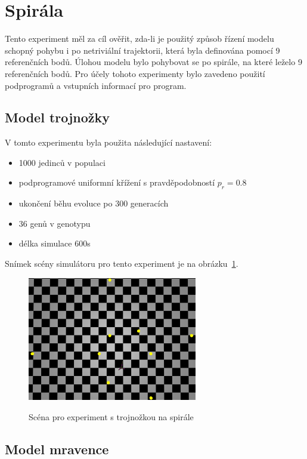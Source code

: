 

\section{Spirála}
Tento experiment měl za cíl ověřit, zda-li je použitý způsob řízení modelu schopný pohybu i po netriviální trajektorii, která byla definována pomocí 9 referenčních bodů.
Úlohou modelu bylo pohybovat se po spirále, na které leželo 9 referenčních bodů.
Pro účely tohoto experimenty bylo zavedeno použití podprogramů a vstupních informací pro program.

\subsection{Model trojnožky}
V tomto experimentu byla použita následující nastavení:
\begin{itemize}
    \item 1000 jedinců v populaci
    \item podprogramové uniformní křížení s pravděpodobností $p_r = 0.8$
    \item ukončení běhu evoluce po 300 generacích
    \item 36 genů v genotypu
    \item délka simulace 600s
\end{itemize}

Snímek scény simulátoru pro tento experiment je na obrázku~\ref{fig:trojnozka_spirala_zhora}.
\begin{figure}[h]
    \centering
    {\includegraphics[width=20em]{obrazky/trojnozka_spirala_zhora.png}}
    \caption{
    Scéna pro experiment s trojnožkou na spirále
    }
    \label{fig:trojnozka_spirala_zhora}
\end{figure}

\subsection{Model mravence}

